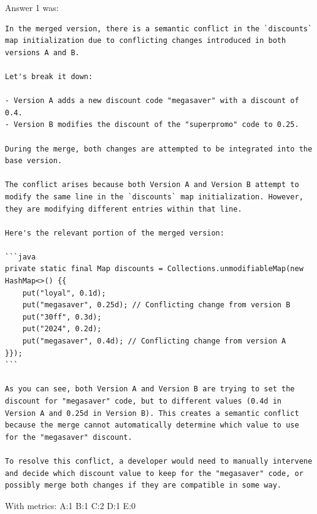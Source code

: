 Answer 1 was:
\begin{lstlisting}
In the merged version, there is a semantic conflict in the `discounts` map initialization due to conflicting changes introduced in both versions A and B.

Let's break it down:

- Version A adds a new discount code "megasaver" with a discount of 0.4.
- Version B modifies the discount of the "superpromo" code to 0.25.

During the merge, both changes are attempted to be integrated into the base version.

The conflict arises because both Version A and Version B attempt to modify the same line in the `discounts` map initialization. However, they are modifying different entries within that line.

Here's the relevant portion of the merged version:

```java
private static final Map discounts = Collections.unmodifiableMap(new HashMap<>() {{
    put("loyal", 0.1d);
    put("megasaver", 0.25d); // Conflicting change from version B
    put("30ff", 0.3d);
    put("2024", 0.2d);
    put("megasaver", 0.4d); // Conflicting change from version A
}});
```

As you can see, both Version A and Version B are trying to set the discount for "megasaver" code, but to different values (0.4d in Version A and 0.25d in Version B). This creates a semantic conflict because the merge cannot automatically determine which value to use for the "megasaver" discount.

To resolve this conflict, a developer would need to manually intervene and decide which discount value to keep for the "megasaver" code, or possibly merge both changes if they are compatible in some way.
\end{lstlisting}

With metrics:
A:1
B:1
C:2
D:1
E:0

